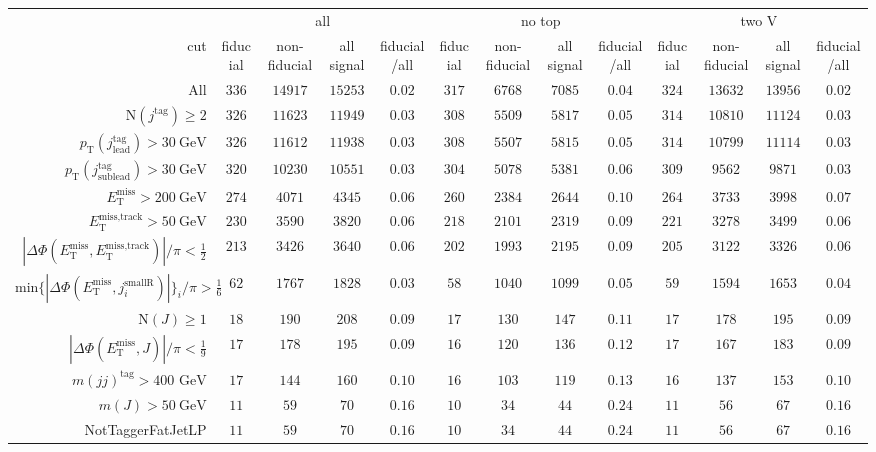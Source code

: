 \begin{tabular}{r|c|c|c|c|c|c|c|c|c|c|c|c|}
 &\multicolumn{4}{|c|}{all}&\multicolumn{4}{c|}{no top}&\multicolumn{4}{|c|}{two V}\\
cut&fiducial&non-fiducial&all signal&fiducial/all&fiducial&non-fiducial&all signal&fiducial/all&fiducial&non-fiducial&all signal&fiducial/all\\
\hline
All&$336$&$14917$&$15253$&$0.02$&$317$&$6768$&$7085$&$0.04$&$324$&$13632$&$13956$&$0.02$\\
$\text{N}(j^\text{tag})\geq2$&$326$&$11623$&$11949$&$0.03$&$308$&$5509$&$5817$&$0.05$&$314$&$10810$&$11124$&$0.03$\\
$p_\text{T}(j^\text{tag}_\text{lead})>30~\text{GeV}$&$326$&$11612$&$11938$&$0.03$&$308$&$5507$&$5815$&$0.05$&$314$&$10799$&$11114$&$0.03$\\
$p_\text{T}(j^\text{tag}_\text{sublead})>30~\text{GeV}$&$320$&$10230$&$10551$&$0.03$&$304$&$5078$&$5381$&$0.06$&$309$&$9562$&$9871$&$0.03$\\
$E_\text{T}^\text{miss} > 200~\text{GeV}$&$274$&$4071$&$4345$&$0.06$&$260$&$2384$&$2644$&$0.10$&$264$&$3733$&$3998$&$0.07$\\
$E_\text{T}^\text{miss,track} > 50~\text{GeV}$&$230$&$3590$&$3820$&$0.06$&$218$&$2101$&$2319$&$0.09$&$221$&$3278$&$3499$&$0.06$\\
$|\Delta\Phi(E_\text{T}^\text{miss},E_\text{T}^\text{miss,track})|/\pi<\frac{1}{2}$&$213$&$3426$&$3640$&$0.06$&$202$&$1993$&$2195$&$0.09$&$205$&$3122$&$3326$&$0.06$\\
$\text{min}\{|\Delta\Phi(E_\text{T}^\text{miss},j^\text{smallR}_i)|\}_i/\pi > \frac{1}{6}$&$62$&$1767$&$1828$&$0.03$&$58$&$1040$&$1099$&$0.05$&$59$&$1594$&$1653$&$0.04$\\
$\text{N}(J)\geq1$&$18$&$190$&$208$&$0.09$&$17$&$130$&$147$&$0.11$&$17$&$178$&$195$&$0.09$\\
$|\Delta\Phi(E_\text{T}^\text{miss},J)|/\pi < \frac{1}{9}$&$17$&$178$&$195$&$0.09$&$16$&$120$&$136$&$0.12$&$17$&$167$&$183$&$0.09$\\
$m(jj)^\text{tag}>400\text{ GeV}$&$17$&$144$&$160$&$0.10$&$16$&$103$&$119$&$0.13$&$16$&$137$&$153$&$0.10$\\
$m(J)>50~\text{GeV}$&$11$&$59$&$70$&$0.16$&$10$&$34$&$44$&$0.24$&$11$&$56$&$67$&$0.16$\\
NotTaggerFatJetLP&$11$&$59$&$70$&$0.16$&$10$&$34$&$44$&$0.24$&$11$&$56$&$67$&$0.16$\\
\end{tabular}
